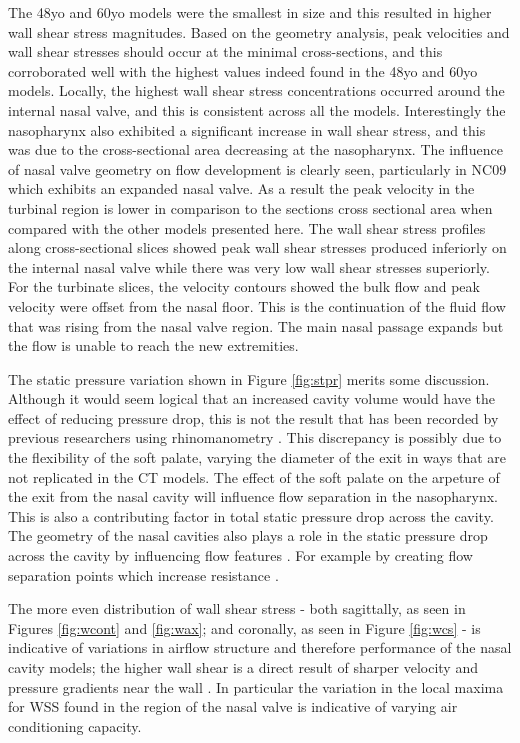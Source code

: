 The 48yo and 60yo models were the smallest in size and this resulted in higher wall shear stress magnitudes. Based on the geometry analysis, peak velocities and wall shear stresses should occur at the minimal cross-sections, and this corroborated well with the highest values indeed found in the 48yo and 60yo models. Locally, the highest wall shear stress concentrations occurred around the internal nasal valve, and this is consistent across all the models. Interestingly the nasopharynx also exhibited a significant increase in wall shear stress, and this was due to the cross-sectional area decreasing at the nasopharynx.
The influence of nasal valve geometry on flow development is clearly seen, particularly in NC09 which exhibits an expanded nasal valve. As a result the peak velocity in the turbinal region is lower in comparison to the sections cross sectional area when compared with the other models presented here.
The wall shear stress profiles along cross-sectional slices showed peak wall shear stresses produced inferiorly on the internal nasal valve while there was very low wall shear stresses superiorly. For the turbinate slices, the velocity contours showed the bulk flow and peak velocity were offset from the nasal floor. This is the continuation of the fluid flow that was rising from the nasal valve region. The main nasal passage expands but the flow is unable to reach the new extremities.

The static pressure variation shown in Figure \ref{fig:stpr} merits some discussion. 
Although it would seem logical that an increased cavity volume would have the effect of reducing pressure drop, this is not the result that has been recorded by previous researchers using rhinomanometry \cite{Lindemann2008}.
This discrepancy is possibly due to the flexibility of the soft palate, varying the diameter of the exit in ways that are not replicated in the CT models.
The effect of the soft palate on the arpeture of the exit from the nasal cavity will influence flow separation in the nasopharynx. This is also a contributing factor in total static pressure drop across the cavity.
The geometry of the nasal cavities also plays a role in the static pressure drop across the cavity by influencing flow features \cite{Ramprasad2016}. For example by creating flow separation points which increase resistance \cite{Ramprasad2016}.

The more even distribution of wall shear stress - both sagittally, as seen in Figures \ref{fig:wcont} and \ref{fig:wax}; and coronally, as seen in Figure \ref{fig:wcs} - is indicative of variations in airflow structure and therefore performance of the nasal cavity models; the higher wall shear is a direct result of sharper velocity and pressure gradients near the wall \cite{Inthavong2014c}. In particular the variation in the local maxima for WSS found in the region of the nasal valve is indicative of varying air conditioning capacity.

